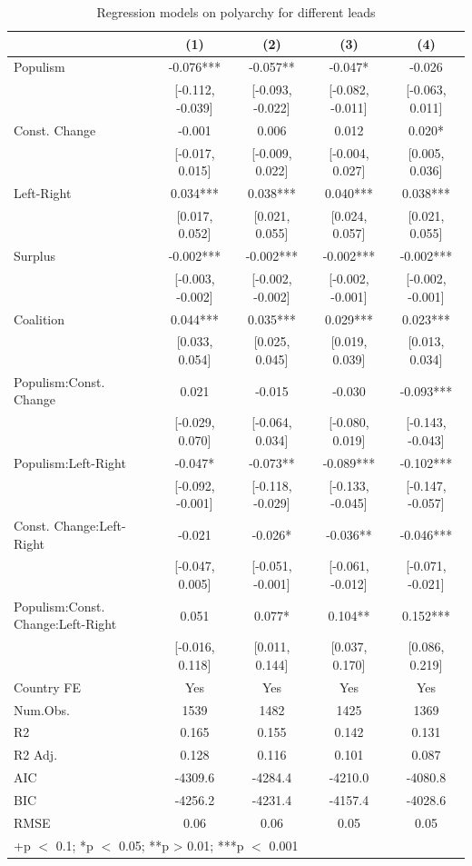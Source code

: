 \documentclass[
  abstract]{article}
\begin{document}
\hypertarget{tbl-leadpolyarchy}{}
\begin{table}
\caption{\label{tbl-leadpolyarchy}Regression models on polyarchy for different leads }\tabularnewline

\centering\centering\centering
\begin{tabular}[t]{lcccc}
\toprule
  & (1) & (2) & (3) & (4)\\
\midrule
Populism & -0.076*** & -0.057** & -0.047* & -0.026\\
 & {}[-0.112, -0.039] & {}[-0.093, -0.022] & {}[-0.082, -0.011] & {}[-0.063, 0.011]\\
Const. Change & -0.001 & 0.006 & 0.012 & 0.020*\\
 & {}[-0.017, 0.015] & {}[-0.009, 0.022] & {}[-0.004, 0.027] & {}[0.005, 0.036]\\
Left-Right & 0.034*** & 0.038*** & 0.040*** & 0.038***\\
 & {}[0.017, 0.052] & {}[0.021, 0.055] & {}[0.024, 0.057] & {}[0.021, 0.055]\\
Surplus & -0.002*** & -0.002*** & -0.002*** & -0.002***\\
 & {}[-0.003, -0.002] & {}[-0.002, -0.002] & {}[-0.002, -0.001] & {}[-0.002, -0.001]\\
Coalition & 0.044*** & 0.035*** & 0.029*** & 0.023***\\
 & {}[0.033, 0.054] & {}[0.025, 0.045] & {}[0.019, 0.039] & {}[0.013, 0.034]\\
Populism:Const. Change & 0.021 & -0.015 & -0.030 & -0.093***\\
 & {}[-0.029, 0.070] & {}[-0.064, 0.034] & {}[-0.080, 0.019] & {}[-0.143, -0.043]\\
Populism:Left-Right & -0.047* & -0.073** & -0.089*** & -0.102***\\
 & {}[-0.092, -0.001] & {}[-0.118, -0.029] & {}[-0.133, -0.045] & {}[-0.147, -0.057]\\
Const. Change:Left-Right & -0.021 & -0.026* & -0.036** & -0.046***\\
 & {}[-0.047, 0.005] & {}[-0.051, -0.001] & {}[-0.061, -0.012] & {}[-0.071, -0.021]\\
Populism:Const. Change:Left-Right & 0.051 & 0.077* & 0.104** & 0.152***\\
 & {}[-0.016, 0.118] & {}[0.011, 0.144] & {}[0.037, 0.170] & {}[0.086, 0.219]\\
\midrule
Country FE & Yes & Yes & Yes & Yes\\
Num.Obs. & 1539 & 1482 & 1425 & 1369\\
R2 & 0.165 & 0.155 & 0.142 & 0.131\\
R2 Adj. & 0.128 & 0.116 & 0.101 & 0.087\\
AIC & -4309.6 & -4284.4 & -4210.0 & -4080.8\\
BIC & -4256.2 & -4231.4 & -4157.4 & -4028.6\\
RMSE & 0.06 & 0.06 & 0.05 & 0.05\\
\bottomrule
\multicolumn{5}{l}{\rule{0pt}{1em}+p $<$ 0.1; *p $<$ 0.05; **p > 0.01; ***p $<$ 0.001}\\
\end{tabular}
\end{table}
\end{document}
